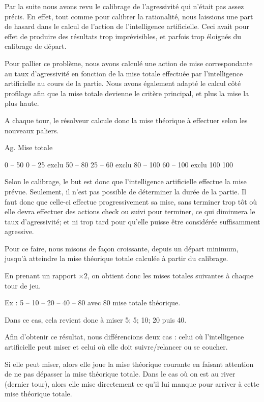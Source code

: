 \documentclass{report}
\begin{document}
\hspace{0.5cm}Par la suite nous avons revu le calibrage de l'agressivité qui n'était pas assez précis. En effet, tout comme pour calibrer la rationalité, nous laissions une part de hasard dans le calcul de l'action de l'intelligence artificielle. Ceci avait pour effet de produire des résultats trop imprévisibles, et parfois trop éloignés du calibrage de départ.\par
Pour pallier ce problème, nous avons calculé une action de mise correspondante au taux d'agressivité en fonction de la mise totale effectuée par l'intelligence artificielle au cours de la partie. Nous avons également adapté le calcul côté profilage afin que la mise totale devienne le critère principal, et plus la mise la plus haute.\par
A chaque tour, le résolveur calcule donc la mise théorique à effectuer selon les nouveaux paliers.\par

	Ag.		Mise totale

	0 – 50		0 – 25	exclu
	50 – 80		25 – 60 exclu
	80 – 100	60 – 100 exclu
	100			100

Selon le calibrage, le but est donc que l'intelligence artificielle effectue la mise prévue. Seulement, il n'est pas possible de déterminer la durée de la partie. Il faut donc que celle-ci effectue progressivement sa mise, sans terminer trop tôt où elle devra effectuer des actions check ou suivi pour terminer, ce qui diminuera le taux d'agressivité; et ni trop tard pour qu'elle puisse être considérée suffisamment agressive.\par
Pour ce faire, nous misons de façon croissante, depuis un départ minimum, jusqu'à atteindre la mise théorique totale calculée à partir du calibrage.\par
En prenant un rapport $\times2$, on obtient donc les mises totales suivantes à chaque tour de jeu.\par
Ex : 	5 – 10 – 20 – 40 – 80 		avec 80 mise totale théorique.

Dans ce cas, cela revient donc à miser 5; 5; 10; 20 puis 40.

Afin d'obtenir ce résultat, nous différencions deux cas : celui où l'intelligence artificielle peut miser et celui où elle doit suivre/relancer ou se coucher.\par
Si elle peut miser, alors elle joue la mise théorique courante en faisant attention de ne pas dépasser la mise théorique totale. Dans le cas où on est au river (dernier tour), alors elle mise directement ce qu'il lui manque pour arriver à cette mise théorique totale.\par
\end{document}
